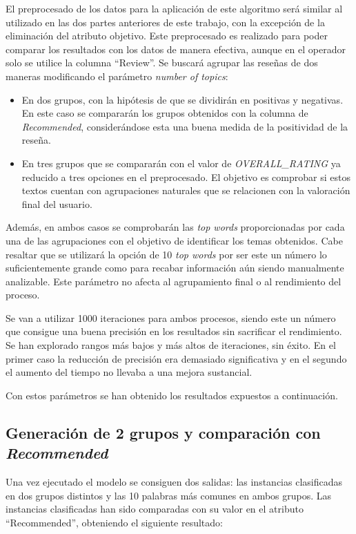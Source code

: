 \documentclass[es]{uc3mreport}
\begin{document}
\begin{report}
El preprocesado de los datos para la aplicación de este algoritmo será similar
al utilizado en las dos partes anteriores de este trabajo, con la excepción de
la eliminación del atributo objetivo. Este preprocesado es realizado para poder
comparar los resultados con los datos de manera efectiva, aunque en el operador
solo se utilice la columna “Review”. Se buscará agrupar las reseñas de dos
maneras modificando el parámetro \textit{number of topics}:

\begin{itemize}
    \item En dos grupos, con la hipótesis de que se dividirán en positivas y
    negativas. En este caso se compararán los grupos obtenidos con la columna
    de \textit{Recommended}, considerándose esta una buena medida de la positividad
    de la reseña.
    \item En tres grupos que se compararán con el valor de \textit{OVERALL\_RATING} ya
    reducido a tres opciones en el preprocesado. El objetivo es comprobar si
    estos textos cuentan con agrupaciones naturales que se relacionen con la
    valoración final del usuario.
\end{itemize}

Además, en ambos casos se comprobarán las \textit{top words} proporcionadas por cada
una de las agrupaciones con el objetivo de identificar los temas obtenidos.
Cabe resaltar que se utilizará la opción de 10 \textit{top words} por ser este un número
lo suficientemente grande como para recabar información aún siendo manualmente
analizable. Este parámetro no afecta al agrupamiento final o al rendimiento del
proceso.

Se van a utilizar 1000 iteraciones para ambos procesos, siendo este un número
que consigue una buena precisión en los resultados sin sacrificar el
rendimiento. Se han explorado rangos más bajos y más altos de iteraciones, sin
éxito. En el primer caso la reducción de precisión era demasiado
significativa y en el segundo el aumento del tiempo no llevaba a una mejora
sustancial.

Con estos parámetros se han obtenido los resultados expuestos a continuación.

\subsection{Generación de 2 grupos y comparación con \textit{Recommended}}
\label{subsec:topicmodelling-recommended}

Una vez ejecutado el modelo se consiguen dos salidas: las instancias
clasificadas en dos grupos distintos y las 10 palabras más comunes en ambos
grupos. Las instancias clasificadas han sido comparadas con su valor en el
atributo “Recommended”, obteniendo el siguiente resultado:


\end{report}
\end{document}
